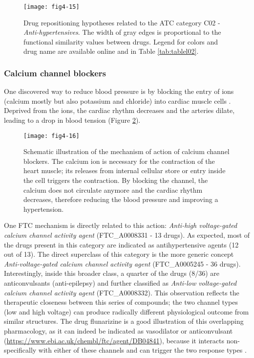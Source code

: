 \begin{figure}[H]
    \centering
    \texttt{[image: fig4-15]}
    \caption{Drug repositioning hypotheses related to the ATC category C02 - \emph{Anti-hypertensives}. The width of gray edges is proportional to the functional similarity values between drugs. Legend for colors and drug name are available online and in Table \ref{tab:tablel02}.}
    \label{fig4-15}
\end{figure}

\subsubsection{Calcium channel blockers}
One discovered way to reduce blood pressure is by blocking the entry of ions (calcium mostly but also potassium and chloride) into cardiac muscle cells \citep{swedberg2005task}. Deprived from the ions, the cardiac rhythm decreases and the arteries dilate, leading to a drop in blood tension (Figure \ref{fig4-16}).

\begin{figure}[H]
    \centering
    \texttt{[image: fig4-16]}
    \caption{Schematic illustration of the mechanism of action of calcium channel blockers. The calcium ion is necessary for the contraction of the heart muscle; its releases from internal cellular store or entry inside the cell triggers the contraction. By blocking the channel, the calcium does not circulate anymore and the cardiac rhythm decreases, therefore reducing the blood pressure and improving a hypertension.}
    \label{fig4-16}
\end{figure}

One FTC mechanism is directly related to this action: \emph{Anti-high voltage-gated calcium channel activity agent} (FTC\_A0008331 - 13 drugs). As expected, most of the drugs present in this category are indicated as antihypertensive agents (12 out of 13). The direct superclass of this category is the more generic concept \emph{Anti-voltage-gated calcium channel activity agent} (FTC\_A0005245 - 36 drugs). Interestingly, inside this broader class, a quarter of the drugs (8/36) are anticonvulsants (anti-epilepsy) and further classified as \emph{Anti-low voltage-gated calcium channel activity agent} (FTC\_A0008332). This observation reflects the therapeutic closeness between this series of compounds; the two channel types (low and high voltage) can produce radically different physiological outcome from similar structures. The drug flunarizine is a good illustration of this overlapping pharmacology, as it can indeed be indicated as vasodilator or anticonvulsant (\url{https://www.ebi.ac.uk/chembl/ftc/agent/DB04841}), because it interacts non-specifically with either of these channels and can trigger the two response types \citep{van1978effect}.


